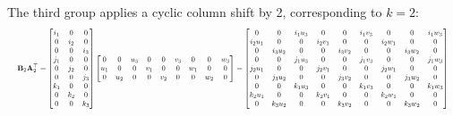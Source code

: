 \documentclass[a4paper,11pt]{article}
\begin{document}
The third group applies a cyclic column shift by 2, corresponding to $k=2$:
\[
\resizebox{\linewidth}{!}{$\displaystyle
\mathbf{B}_2 \mathbf{A}_2^\top =
\begin{bmatrix}
i_1 & 0 & 0 \\ 0 & i_2 & 0 \\ 0 & 0 & i_3 \\
j_1 & 0 & 0 \\ 0 & j_2 & 0 \\ 0 & 0 & j_3 \\
k_1 & 0 & 0 \\ 0 & k_2 & 0 \\ 0 & 0 & k_3
\end{bmatrix}
\begin{bmatrix}
0 & 0 & u_3 & 0 & 0 & v_3 & 0 & 0 & w_3 \\
u_1 & 0 & 0 & v_1 & 0 & 0 & w_1 & 0 & 0 \\
0 & u_2 & 0 & 0 & v_2 & 0 & 0 & w_2 & 0
\end{bmatrix}
=
\begin{bmatrix}
0 & 0 & i_1 u_3 & 0 & 0 & i_1 v_3 & 0 & 0 & i_1 w_3 \\
i_2 u_1 & 0 & 0 & i_2 v_1 & 0 & 0 & i_2 w_1 & 0 & 0 \\
0 & i_3 u_2 & 0 & 0 & i_3 v_2 & 0 & 0 & i_3 w_2 & 0 \\
0 & 0 & j_1 u_3 & 0 & 0 & j_1 v_3 & 0 & 0 & j_1 w_3 \\
j_2 u_1 & 0 & 0 & j_2 v_1 & 0 & 0 & j_2 w_1 & 0 & 0 \\
0 & j_3 u_2 & 0 & 0 & j_3 v_2 & 0 & 0 & j_3 w_2 & 0 \\
0 & 0 & k_1 u_3 & 0 & 0 & k_1 v_3 & 0 & 0 & k_1 w_3 \\
k_2 u_1 & 0 & 0 & k_2 v_1 & 0 & 0 & k_2 w_1 & 0 & 0 \\
0 & k_3 u_2 & 0 & 0 & k_3 v_2 & 0 & 0 & k_3 w_2 & 0
\end{bmatrix}
$}
\]
\end{document}
